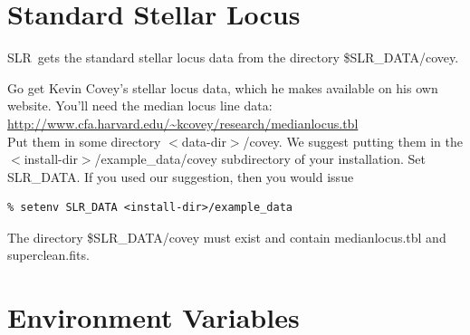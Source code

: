 \documentclass{report}
\newcommand{\slr}{SLR}
\begin{document}




\section{Standard Stellar Locus}

\slr\ gets the standard stellar locus data from the directory
\$SLR\_DATA/covey.

Go get Kevin Covey's stellar locus data, which he makes available on
his own website. You'll need 
the median locus line data:\\
\url{http://www.cfa.harvard.edu/~kcovey/research/medianlocus.tbl}\\
Put them in some directory $<$data-dir$>$/covey. We suggest putting
them in the $<$install-dir$>$/example\_data/covey subdirectory of
your installation. Set SLR\_DATA. If you used our suggestion, then
you would issue

\begin{verbatim}
% setenv SLR_DATA <install-dir>/example_data
\end{verbatim}

The directory \$SLR\_DATA/covey must exist and contain
medianlocus.tbl and superclean.fits.

\section{Environment Variables}
\end{document}
